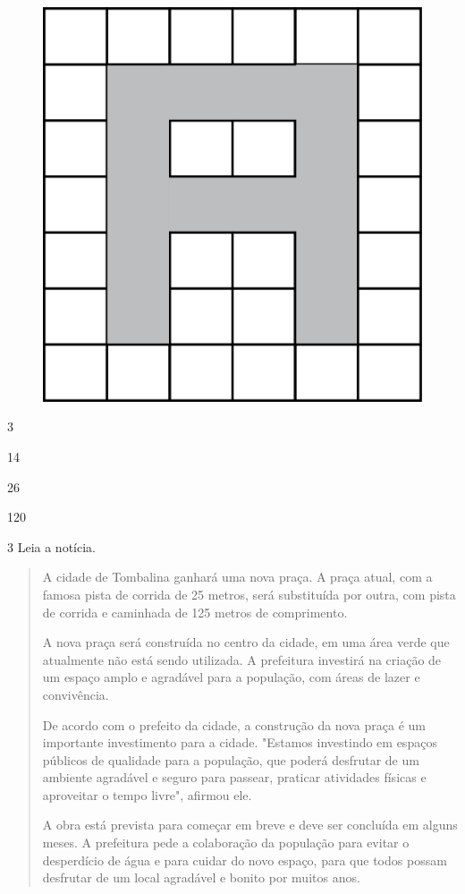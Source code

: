 \begin{figure}[htpb!]
\centering
\includegraphics[width=.8\textwidth]{./media/image62.png}
\end{figure}

\begin{escolha}
\item
  3
\item
  14
\item
  26
\item
  120
\end{escolha}

\pagebreak
\num{3} Leia a notícia.

\begin{quote}
A cidade de Tombalina ganhará uma nova praça. A praça atual, com a famosa pista de corrida de 25 metros, será substituída por outra, com pista de corrida e caminhada de 125 metros de comprimento.

A nova praça será construída no centro da cidade, em uma área verde que atualmente não está sendo utilizada. A prefeitura investirá na criação de um espaço amplo e agradável para a população, com áreas de lazer e convivência.

De acordo com o prefeito da cidade, a construção da nova praça é um importante investimento para a cidade. "Estamos investindo em espaços públicos de qualidade para a população, que poderá desfrutar de um ambiente agradável e seguro para passear, praticar atividades físicas e aproveitar o tempo livre", afirmou ele.

A obra está prevista para começar em breve e deve ser concluída em alguns meses. A prefeitura pede a colaboração da população para evitar o desperdício de água e para cuidar do novo espaço, para que todos possam desfrutar de um local agradável e bonito por muitos anos.

\end{quote}

